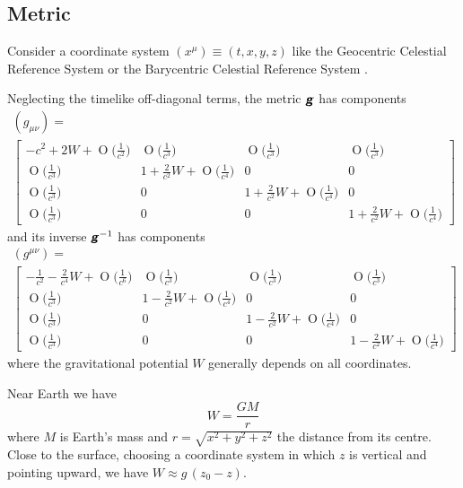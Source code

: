 \documentclass[\ifafour a4paper,12pt,\else a5paper,10pt,\fi%
onecolumn,oneside,article,%
british%
]{memoir}
\theoremstyle{remark}
\theoremstyle{innote}
\newcommand*{\mathte}[1]{\textbf{\textit{\textsf{#1}}}}
\DeclareMathOperator{\Ord}{O}%
\renewcommand*{\|}[1][]{\nonscript\:#1\vert\nonscript\:\mathopen{}}
\newcommand*{\sect}{\S}%
\newcommand*{\yg}{\mathte{g}}
\newcommand*{\yW}{W}
\newcommand*{\Oc}[1]{\Ord\bigl(\tfrac{1}{c^{#1}}\bigr)}
\begin{document}
\subsection{Metric}
\label{sec:GCRS_metric}

Consider a coordinate system $(x^{\mu}) \equiv (t,x,y,z)$ like the Geocentric Celestial Reference System or the Barycentric Celestial Reference System \autocites{soffeletal2003,petitetal2005}[\sect\,8.1.1]{poissonetal2014}[see also][\sect\,2.3.1.1]{moyer2000}.

Neglecting the timelike off-diagonal terms, the metric $\yg$ has components
\begin{multline}
  \label{eq:metric_GCRS}
  (g_{\mu\nu}) ={}\\
  \begin{bmatrix}
    -c^{2} + 2 \yW + \Ord\bigl(\frac{1}{c^{2}}\bigr) &
    \Ord\bigl(\frac{1}{c^{3}}\bigr) &
    \Ord\bigl(\frac{1}{c^{3}}\bigr) &
    \Ord\bigl(\frac{1}{c^{3}}\bigr)
    \\
    \Ord\bigl(\frac{1}{c^{3}}\bigr) &
    1 + \frac{2}{c^{2}} \yW + \Ord\bigl(\frac{1}{c^{4}}\bigr) &
    0 &
    0
    \\
    \Ord\bigl(\frac{1}{c^{3}}\bigr) &
    0 &
    1 + \frac{2}{c^{2}} \yW + \Ord\bigl(\frac{1}{c^{4}}\bigr) &
    0
    \\
    \Ord\bigl(\frac{1}{c^{3}}\bigr) &
    0 &
    0 &
    1 + \frac{2}{c^{2}} \yW + \Ord\bigl(\frac{1}{c^{4}}\bigr)
  \end{bmatrix}
\end{multline}
and its inverse $\yg^{-1}$ has components
\begin{multline}
  \label{eq:inv_metric_GCRS}
  (g^{\mu\nu}) ={}\\
  \begin{bmatrix}
    -\frac{1}{c^{2}} - \frac{2}{c^{4}} \yW + \Oc{6} &
    \Oc{3} &
    \Oc{3} &
    \Oc{3}
    \\
    \Oc{3} &
    1 - \frac{2}{c^{2}} \yW + \Oc{4} &
    0 &
    0
    \\
    \Oc{3} &
    0 &
    1 - \frac{2}{c^{2}} \yW + \Oc{4} &
    0
    \\
    \Oc{3} &
    0 &
    0 &
    1 - \frac{2}{c^{2}} \yW + \Oc{4}
  \end{bmatrix}
\end{multline}
where the gravitational potential $\yW$ generally depends on all coordinates.

Near Earth we have
\begin{equation}
  \label{eq:grav_potential_GCRS}
  \yW = \frac{G M}{r}
\end{equation}
where $M$ is Earth's mass and $r=\sqrt{x^{2}+y^{2}+z^{2}}$ the distance from its centre. Close to the surface, choosing a coordinate system in which $z$ is vertical and pointing upward, we have $\yW\approx g\,(z_{0}-z)$.
\end{document}
